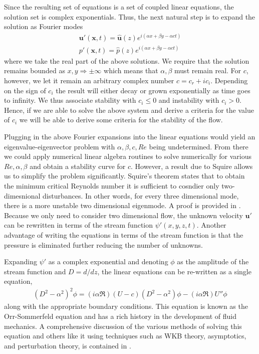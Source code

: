 Since the resulting set of equations is a set of coupled linear equations, the solution set is complex exponentials. Thus, the next natural step is to expand the solution as Fourier modes  
\begin{align}
\bm{u}'(\bm{x},t) = \hat{\bm{u}}(z)e^{i(\alpha x +\beta y -\alpha ct)}\\
p'(\bm{x},t) = \hat{p}(z)e^{i(\alpha x +\beta y -\alpha ct)}
\end{align}
where we take the real part of the above solutions. We require that the solution remains bounded as $x,y\Rightarrow\pm\infty$ which means that $\alpha,\beta$ must remain real. For $c$, however, we let it remain an arbitrary complex number $c=c_{r} + ic_{i}$. Depending on the sign of $c_{i}$ the result will either decay or grown exponentially as time goes to infinity. We thus associate stability with $c_{i}\le 0$ and instability with $c_{i}>0$. Hence, if we are able to solve the above system and derive a criteria for the value of $c_{i}$ we will be able to derive some criteria for the stability of the flow.

Plugging in the above Fourier expansions into the linear equations would yield an eigenvalue-eigenvector problem with $\alpha,\beta,c,Re$ being undetermined. From there we could apply numerical linear algebra routines to solve numerically for various $Re,\alpha,\beta$ and obtain a stability curve for $c$. However, a result due to Squire allows us to simplify the problem significantly. Squire's theorem states that to obtain the minimum critical Reynolds number it is sufficient to cosndier only two-dimesnional disturbances\cite{drazinreid}. In other words, for every three dimensional mode, there is a more unstable two dimensional eigenmode. A proof is provided in \cite{drazinreid}.  Because we only need to consider two dimensional flow, the unknown velocity $\bm{u}'$ can be rewritten in terms of the stream function $\psi'(x,y,z,t)$. Another advantage of writing the equations in terms of the stream function is that the pressure is eliminated further reducing the number of unknowns. 

Expanding $\psi'$ as a complex exponential and denoting $\phi$ as the amplitude of the stream function and $D=d/dz$, the linear equations can be re-written as a single equation, 
\begin{align}
(D^{2}-\alpha^{2})^{2}\phi = (i\alpha \Re)(U-c)(D^{2}-\alpha^{2})\phi -(i\alpha \Re)U''\phi
\end{align}
along with the appropriate boundary conditions. This equation is known as the Orr-Sommerfeld equation and has a rich history in the development of fluid mechanics. A comprehensive discussion of the various methods of solving this equation and others like it using techniques such as WKB theory, asymptotics, and perturbation theory, is contained in \cite{drazinreid,vandyke,benderorszag}.

